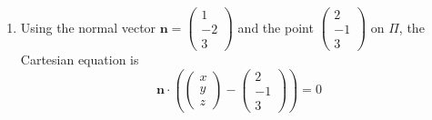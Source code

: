 \documentclass[leqno]{article}
\begin{document}
\begin{enumerate}[
  label=\textbf{\arabic*.},
  leftmargin=*,
  topsep=0pt,
  partopsep=0pt,
  parsep=0pt
]
\begin{tcolorbox}[colback=white, colframe=scarlet, title={\textbf{Solution}}, breakable, grow to left by=6mm, grow to right by=10mm]
\begin{enumerate}[label=\textbf{(\alph*)}]
  The plane \(\Pi\) has direction vectors
  \[
  \begin{pmatrix}1\\2\\1\end{pmatrix}
  \quad \text{and} \quad
  \begin{pmatrix}4\\-1\\-2\end{pmatrix}
  \]
  
  Check the dot products:
  \[
  \mathbf n\cdot \begin{pmatrix}1\\2\\1\end{pmatrix}
  =1(1)+(-2)(2)+3(1)
  =1-4+3
  =0
  \]
  \[
  \mathbf n\cdot \begin{pmatrix}4\\-1\\-2\end{pmatrix}
  =1(4)+(-2)(-1)+3(-2)
  =4+2-6
  =0
  \]
  
  Since \(\mathbf n\) is perpendicular to both direction vectors of the plane, \(\mathbf n\) is perpendicular to \(\Pi\).
  
  Therefore \(\mathbf i-2\mathbf j+3\mathbf k\) is perpendicular to \(\Pi\).

  \item Using the normal vector \(\mathbf n=\begin{pmatrix}1\\-2\\3\end{pmatrix}\) and the point \(\begin{pmatrix}2\\-1\\3\end{pmatrix}\) on \(\Pi\), the Cartesian equation is
  \[
  \mathbf n\cdot \left(\begin{pmatrix}x\\y\\z\end{pmatrix}-\begin{pmatrix}2\\-1\\3\end{pmatrix}\right)=0
  \]
  

\end{enumerate}
\end{tcolorbox}
\end{enumerate}
\end{document}
